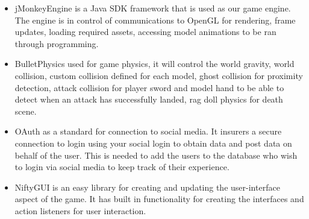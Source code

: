 \documentclass[letterpaper]{article}
\begin{document}
			\begin{itemize}
				\item jMonkeyEngine is a Java SDK framework that is used as our game engine. The engine is in control of communications to OpenGL for rendering, frame updates, loading required assets, accessing model animations to be ran through programming.
				\item BulletPhysics used for game physics, it will control the world gravity, world collision, custom collision defined for each model, ghost collision for proximity detection, attack collision for player sword and model hand to be able to detect when an attack has successfully landed, rag doll physics for death scene.
				\item OAuth as a standard for connection to social media. It insurers a secure connection to login using your social login to obtain data and post data on behalf of the user. This is needed to add the users to the database who wish to login via social media to keep track of their experience.
				\item NiftyGUI is an easy library for creating and updating the user-interface aspect of the game. It has built in functionality for creating the interfaces and action listeners for user interaction.
			\end{itemize}
			
		\vspace{0.2in}
		\section*{\colorbox{blue}{}}
		\vspace{0.1in}
			
\end{document}
